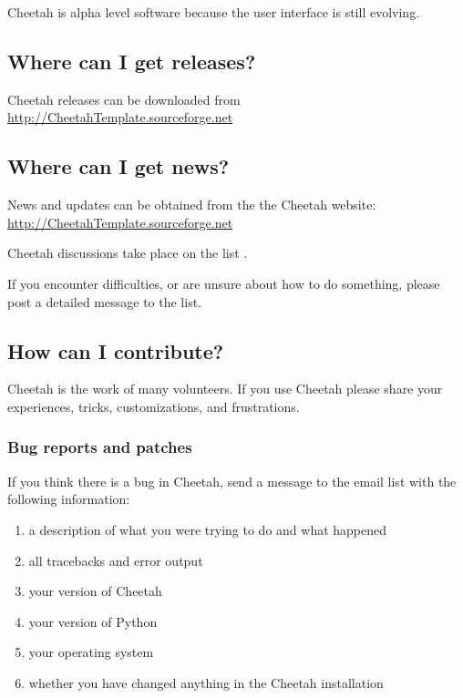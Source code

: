 Cheetah is alpha level software because the user interface is still evolving.

\subsection{Where can I get releases?}
\label{intro.releases}

Cheetah releases can be downloaded from
\url{http://CheetahTemplate.sourceforge.net}

\subsection{Where can I get news?}
\label{intro.news}

News and updates can be obtained from the the Cheetah website:
\url{http://CheetahTemplate.sourceforge.net}

Cheetah discussions take place on the list
.

If you encounter difficulties, or are unsure about how to do something,
please post a detailed message to the list.

\subsection{How can I contribute?}
\label{intro.contribute}

Cheetah is the work of many volunteers.  If you use Cheetah please share your
experiences, tricks, customizations, and frustrations.

\subsubsection{Bug reports and patches}

If you think there is a bug in Cheetah, send a message to the email list
with the following information:

\begin{enumerate}
\item a description of what you were trying to do and what happened
\item all tracebacks and error output
\item your version of Cheetah
\item your version of Python
\item your operating system
\item whether you have changed anything in the Cheetah installation
\end{enumerate}


